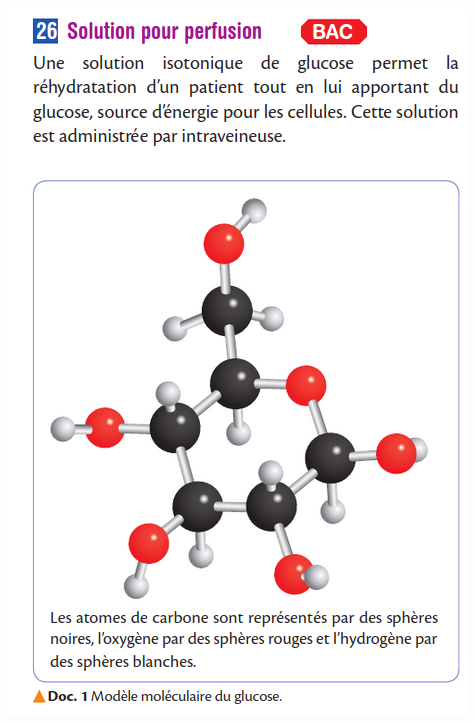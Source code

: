 \documentclass[10pt]{article}
\newcommand{\myscale}{0.41}
\begin{document}
\begin{center}
\begin{minipage}[c]{0.45\textwidth}
	\end{minipage}


	\begin{minipage}[c]{0.45\textwidth}
		\centering
		\includegraphics[scale=\myscale]{assets/26a.png}
	\end{minipage}
	\hspace{0.05\textwidth}
	\begin{minipage}[c]{0.45\textwidth}
		\centering

\end{minipage}
\end{center}
\end{document}
